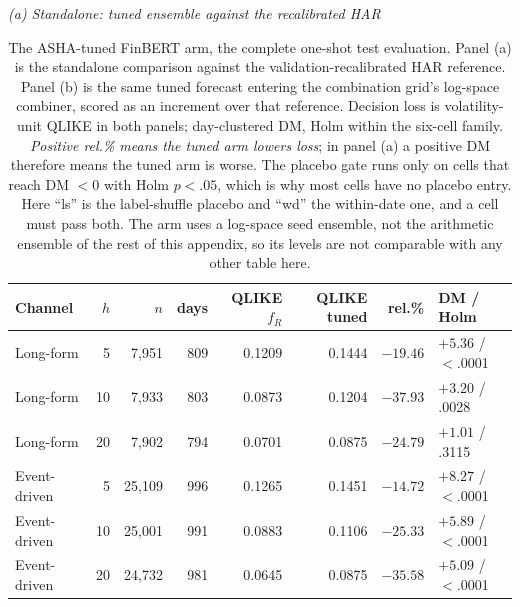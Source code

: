 \begin{table}[htbp]
\centering
\caption[The tuned challenger arm: standalone and combination]{The
ASHA-tuned FinBERT arm, the complete one-shot test evaluation. Panel (a)
is the standalone comparison against the validation-recalibrated HAR
reference. Panel (b) is the same tuned forecast entering the combination
grid's log-space combiner, scored as an increment over that reference.
Decision loss is volatility-unit QLIKE in both panels; day-clustered DM,
Holm within the six-cell family. \emph{Positive rel.\% means the tuned arm
lowers loss}; in panel (a) a positive DM therefore means the tuned arm is
worse. The placebo gate runs only on cells that reach DM $<0$ with Holm
$p<.05$, which is why most cells have no placebo entry. Here ``ls'' is the
label-shuffle placebo and ``wd'' the within-date one, and a cell must pass
both. The arm uses a log-space seed ensemble, not the arithmetic ensemble
of the rest of this appendix, so its levels are not comparable with any
other table here.}
\label{tab:app-hpo}
\singlespacing\small
\setlength{\tabcolsep}{4pt}

\emph{(a) Standalone: tuned ensemble against the recalibrated HAR}\\[0.4ex]
\begin{tabular}{@{}lrrrrrrl@{}}
\toprule
Channel & $h$ & $n$ & days & QLIKE $f_R$ & QLIKE tuned & rel.\% & DM / Holm \\
\midrule
Long-form    &  5 & 7{,}951  & 809 & 0.1209 & 0.1444 & $-19.46$ & $+5.36$ / $<$.0001 \\
Long-form    & 10 & 7{,}933  & 803 & 0.0873 & 0.1204 & $-37.93$ & $+3.20$ / .0028 \\
Long-form    & 20 & 7{,}902  & 794 & 0.0701 & 0.0875 & $-24.79$ & $+1.01$ / .3115 \\
Event-driven &  5 & 25{,}109 & 996 & 0.1265 & 0.1451 & $-14.72$ & $+8.27$ / $<$.0001 \\
Event-driven & 10 & 25{,}001 & 991 & 0.0883 & 0.1106 & $-25.33$ & $+5.89$ / $<$.0001 \\
Event-driven & 20 & 24{,}732 & 981 & 0.0645 & 0.0875 & $-35.58$ & $+5.09$ / $<$.0001 \\
\bottomrule
\end{tabular}


\end{table}
